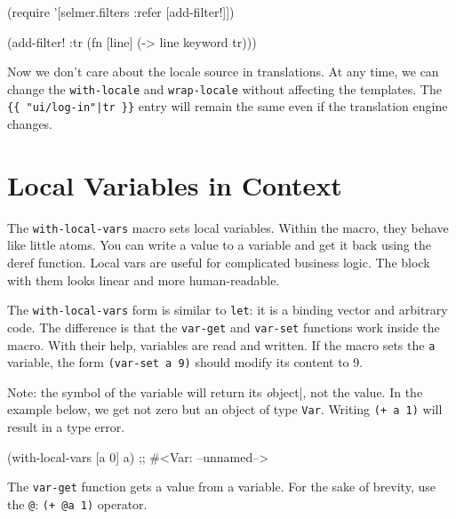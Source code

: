 \begin{english}
  \begin{clojure}
(require '[selmer.filters :refer [add-filter!]])

(add-filter! :tr
 (fn [line]
   (-> line keyword tr)))
  \end{clojure}
\end{english}

\fi

Now we don't care about the locale source in translations. At any time, we can change the \verb|with-locale| and \verb|wrap-locale| without affecting the templates.
The \verb={{ "ui/log-in"|tr }}= entry will remain the same even if the translation engine changes.

\section{Local Variables in Context}


The \verb|with-local-vars| macro sets local variables. Within the macro, they behave like little atoms. You can write a value to a variable and get it back using the deref function.
Local vars are useful for complicated business logic. The block with them looks linear and more human-readable.

The \verb|with-local-vars| form is similar to \verb|let|: it is a binding vector and arbitrary code. The difference is that the \verb|var-get| and \verb|var-set| functions work inside the macro.
With their help, variables are read and written.
If the macro sets the \verb|a| variable, the form \verb|(var-set a 9)| should modify its content to 9.

Note: the symbol of the variable will return its \emph object|, not the value.
In the example below, we get not zero but an object of type \verb|Var|. Writing \verb|(+ a 1)| will result in a type error.

\begin{english}
  \begin{clojure}
(with-local-vars [a 0] a)
;; #<Var: --unnamed-->
  \end{clojure}
\end{english}

The \verb|var-get| function gets a value from a variable. For the sake of brevity, use the \verb|@|: \verb|(+ @a 1)| operator.

